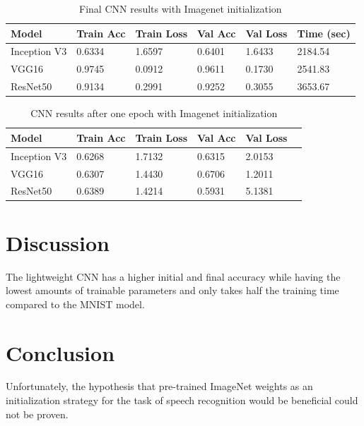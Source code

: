\documentclass{article}
\theoremstyle{definition}
\theoremstyle{remark}
\begin{document}
\begin{table}[h!]
\center
\begin{tabular}{|l|l|l|l|l|l|}
\hline
\textbf{Model} & \textbf{Train Acc} & \textbf{Train Loss} & \textbf{Val Acc} & \textbf{Val Loss} & \textbf{Time (sec)}\\ \hline
 Inception V3	& 0.6334  & 1.6597  & 0.6401	& 1.6433 &	2184.54\\ \hline
 VGG16  		& 0.9745  	 	 & 0.0912      & 0.9611	  	  &	0.1730 	 & 2541.83\\ \hline     
 ResNet50  	& 0.9134  	  	& 0.2991  	   & 0.9252	 	  &	0.3055	 &  3653.67\\ \hline
\end{tabular}
\caption{Final CNN results with Imagenet initialization}
\label{tab:final_cnn_results_imagenet}
\end{table}

\begin{table}[h!]
\center
\begin{tabular}{|l|l|l|l|l|l|}
\hline
\textbf{Model} & \textbf{Train Acc} & \textbf{Train Loss} & \textbf{Val Acc} & \textbf{Val Loss}\\ \hline
Inception V3 & 0.6268  		 & 1.7132  	 & 0.6315	& 2.0153	\\ \hline
VGG16  		& 0.6307  	 	 & 1.4430    & 0.6706	&	1.2011 \\ \hline
ResNet50  	& 0.6389  	  	 & 1.4214  	 & 0.5931	&	5.1381\\ \hline
\end{tabular}
\caption{CNN results after one epoch with Imagenet initialization}
\label{tab:one_epoch_cnn_results_imagenet}
\end{table}



\section{Discussion}

The lightweight CNN has a higher initial and final accuracy while having the lowest amounts of trainable parameters and only takes half the training time compared to the MNIST model.



\section{Conclusion}

Unfortunately, the hypothesis that pre-trained ImageNet weights as an initialization strategy for the task of speech recognition would be beneficial could not be proven.
\end{document}
